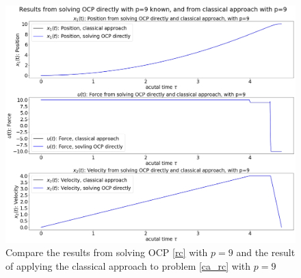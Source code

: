 \documentclass  [
  paper    = a4,
  BCOR     = 10mm,
  twoside,
  fontsize = 12pt,
  fleqn,
  toc      = bibnumbered,
  toc      = listofnumbered,
  numbers  = noendperiod,
  headings = normal,
  listof   = leveldown,
  version  = 3.03
]                                       {scrreprt}
\newcommand{\<}{\langle}
\renewcommand{\>}{\rangle}
\begin{document}
\begin{figure}[H]
	\centerline{\includegraphics[width=12.5cm]{ca_compare_p9_old.png}}
	\caption{Compare the results from solving OCP \ref{rc} with $p=9$ and the result of applying the classical approach to problem \ref{ca_rc} with $p=9$}
	\label{fig_ca_compare_p9}
\end{figure}




 




\end{document}
